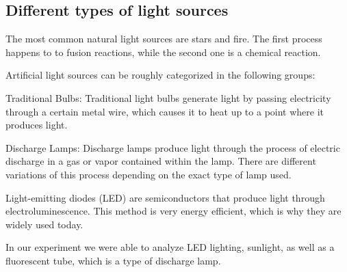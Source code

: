     \subsection{Different types of light sources}

    The most common natural light sources are stars and fire. The first process happens to to fusion reactions, while the
    second one is a chemical reaction.

    Artificial light sources can be roughly categorized in the following groups:

    Traditional Bulbs:
        Traditional light bulbs generate light by passing electricity through a certain metal wire, which causes it
        to heat up to a point where it produces light.

    Discharge Lamps:
        Discharge lamps produce light through the process of electric discharge in a gas or vapor 
        contained within the lamp. There are different variations of this process depending on the exact
        type of lamp used.

    Light-emitting diodes (LED) are semiconductors that produce light through electroluminescence.
    This method is very energy efficient, which is why they are widely used today.

    In our experiment we were able to analyze LED lighting, sunlight, as well as a fluorescent tube, which is a type of discharge lamp.